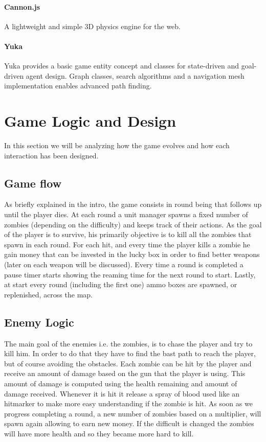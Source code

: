 \documentclass[12pt,a4paper,oneside]{article}
\theoremstyle{definition}
\begin{document}
\paragraph{Cannon.js} A lightweight and simple 3D physics engine for the web.
\paragraph{Yuka}
Yuka provides a basic game entity concept and classes for state-driven and goal-driven agent design.
Graph classes, search algorithms and a navigation mesh implementation enables advanced path finding.

\section{Game Logic and Design}

In this section we will be analyzing how the game evolves and how each interaction has been designed.

\subsection{Game flow}

As briefly explained in the intro, the game consists in round being that follows up until the player dies. At each round a unit manager spawns a fixed number of zombies (depending on the difficulty) and keeps track of their actions. As the goal of the player is to survive, his primarily objective is to kill all the zombies that spawn in each round. For each hit, and every time the player kills a zombie he gain money that can be invested in the lucky box in order to find better weapons (later on each weapon will be discussed). Every time a round is completed a pause timer starts showing the reaming time for the next round to start. Lastly, at start every round (including the first one) ammo boxes are spawned, or replenished, across the map.

\subsection{Enemy Logic}
The main goal of the enemies i.e. the zombies, is to chase the player and try to kill him. In order to do that they have to find the bast path to reach the player, but of course avoiding the obstacles. Each zombie can be hit by the player and receive an amount of damage based on the gun that the player is using. This amount of damage is computed using the health remaining and amount of damage received. Whenever it is hit it release a spray of blood used like an hitmarker to make more easy understanding if the zombie is hit. As soon as we progress completing a round, a new number of zombies based on a multiplier, will spawn again allowing to earn new money.
If the difficult is changed the zombies will have more health and so they became more hard to kill.
\end{document}
